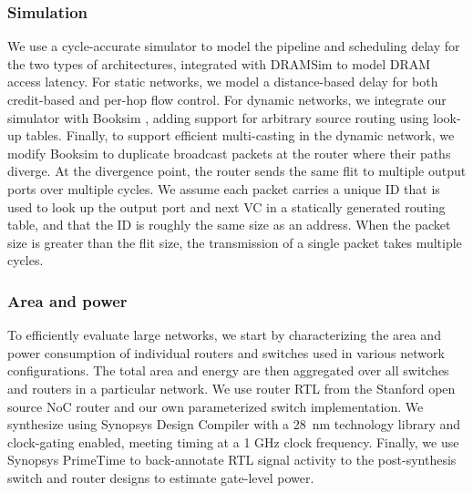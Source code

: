 \subsubsection{Simulation}
We use a cycle-accurate simulator to model the pipeline and scheduling delay for the two types of architectures,
 integrated with DRAMSim \cite{dramsim} to model DRAM access latency. For static networks, we model
a distance-based delay for both credit-based and per-hop flow control. 
For dynamic networks, we integrate
our simulator with Booksim \cite{jiang2013detailed}, adding support for arbitrary source routing using look-up tables. 
Finally, to support efficient multi-casting in the dynamic network, we modify Booksim to duplicate broadcast packets at the router where their paths diverge.
At the divergence point, the router sends the same flit to multiple output ports over multiple cycles.
We assume each packet carries a unique ID that is used to look up the output port and next VC in a statically generated routing table, and that the ID is roughly the same size as an address.
When the packet size is greater than the flit size, the transmission of a single packet takes multiple cycles.

\subsubsection{Area and power}
To efficiently evaluate large networks, we start by characterizing the area and power consumption of individual routers and switches
used in various network configurations. 
The total area and energy are then aggregated over all switches and routers in a particular network.
We use router RTL from the Stanford open source NoC router \cite{becker2012efficient} and our own parameterized switch implementation.
We synthesize using Synopsys Design Compiler with a \SI{28}{nm} technology library and clock-gating enabled, meeting timing at a 1 GHz clock frequency.
Finally, we use Synopsys PrimeTime to back-annotate RTL signal activity to the post-synthesis switch and router designs to estimate gate-level power.

